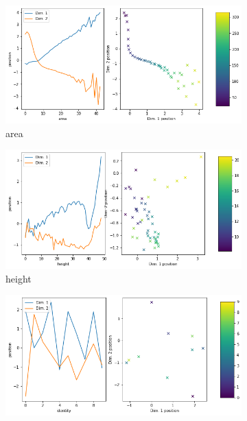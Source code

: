 \begin{figure}[H]
    \centering
    \begin{subfigure}{.48\textwidth}
        \includegraphics[width=\textwidth]{images/latent_space_traversals/vae_gan_mnist_morpho_latent_space_values_area.png}
        \caption{area}
    \end{subfigure}
    \hfill
    \begin{subfigure}{.48\textwidth}
        \includegraphics[width=\textwidth]{images/latent_space_traversals/vae_gan_mnist_morpho_latent_space_values_height.png}
        \caption{height}
    \end{subfigure}
    \begin{subfigure}{.48\textwidth}
        \includegraphics[width=\textwidth]{images/latent_space_traversals/vae_gan_mnist_morpho_latent_space_values_identity.png}

\end{subfigure}
\end{figure}
